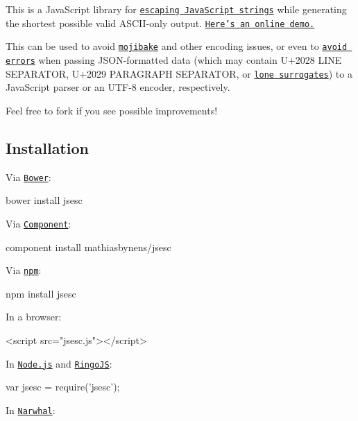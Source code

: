 This is a Java\+Script library for \href{http://mathiasbynens.be/notes/javascript-escapes}{\tt escaping Java\+Script strings} while generating the shortest possible valid A\+S\+C\+I\+I-\/only output. \href{http://mothereff.in/js-escapes}{\tt Here’s an online demo.}

This can be used to avoid \href{http://en.wikipedia.org/wiki/Mojibake}{\tt mojibake} and other encoding issues, or even to \href{https://twitter.com/annevk/status/380000829643571200}{\tt avoid errors} when passing J\+S\+O\+N-\/formatted data (which may contain U+2028 L\+I\+NE S\+E\+P\+A\+R\+A\+T\+OR, U+2029 P\+A\+R\+A\+G\+R\+A\+PH S\+E\+P\+A\+R\+A\+T\+OR, or \href{http://esdiscuss.org/topic/code-points-vs-unicode-scalar-values#content-14}{\tt lone surrogates}) to a Java\+Script parser or an U\+T\+F-\/8 encoder, respectively.

Feel free to fork if you see possible improvements!

\subsection*{Installation}

Via \href{http://bower.io/}{\tt Bower}\+:


\begin{DoxyCode}
bower install jsesc
\end{DoxyCode}


Via \href{https://github.com/component/component}{\tt Component}\+:


\begin{DoxyCode}
component install mathiasbynens/jsesc
\end{DoxyCode}


Via \href{http://npmjs.org/}{\tt npm}\+:


\begin{DoxyCode}
npm install jsesc
\end{DoxyCode}


In a browser\+:


\begin{DoxyCode}
<script src="jsesc.js"></script>
\end{DoxyCode}


In \href{http://nodejs.org/}{\tt Node.\+js} and \href{http://ringojs.org/}{\tt Ringo\+JS}\+:


\begin{DoxyCode}
var jsesc = require('jsesc');
\end{DoxyCode}


In \href{http://narwhaljs.org/}{\tt Narwhal}\+:


